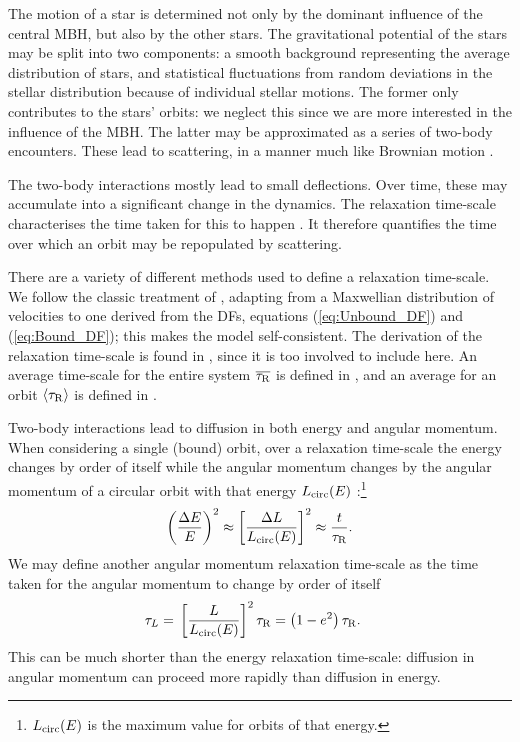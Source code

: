 The motion of a star is determined not only by the dominant influence of the central MBH, but also by the other stars. The gravitational potential of the stars may be split into two components: a smooth background representing the average distribution of stars, and statistical fluctuations from random deviations in the stellar distribution because of individual stellar motions. The former only contributes to the stars' orbits: we neglect this since we are more interested in the influence of the MBH. The latter may be approximated as a series of two-body encounters. These lead to scattering, in a manner much like Brownian motion \citep{Bekenstein1992,Maoz1993,Nelson1999}.

The two-body interactions mostly lead to small deflections. Over time, these may accumulate into a significant change in the dynamics. The relaxation time-scale characterises the time taken for this to happen \citep[section 1.2.1]{Binney2008}. It therefore quantifies the time over which an orbit may be repopulated by scattering.

There are a variety of different methods used to define a relaxation time-scale. We follow the classic treatment of \citet[chapter 2]{Chandrasekhar1960}, adapting from a Maxwellian distribution of velocities to one derived from the DFs, equations (\ref{eq:Unbound_DF}) and (\ref{eq:Bound_DF}); this makes the model self-consistent. The derivation of the relaxation time-scale is found in , since it is too involved to include here. An average time-scale for the entire system $\overline{\tau_\mathrm{R}}$ is defined in , and an average for an orbit $\left\langle\tau_\mathrm{R}\right\rangle$ is defined in . 

Two-body interactions lead to diffusion in both energy and angular momentum. When considering a single (bound) orbit, over a relaxation time-scale the energy changes by order of itself while the angular momentum changes by the angular momentum of a circular orbit with that energy $L_\mathrm{circ}(E)$ \citep{Lightman1977, Rauch1996, Hopman2005, Madigan2011}:\footnote{$L_\mathrm{circ}(E)$ is the maximum value for orbits of that energy.}
\begin{equation}
\left(\dfrac{\Delta E}{E}\right)^{2} \approx \left[\dfrac{\Delta L}{L_\mathrm{circ}(E)}\right]^{2} \approx \dfrac{t}{\tau_\mathrm{R}}.
\label{eq:diffuse-relax}
\end{equation}
We may define another angular momentum relaxation time-scale as the time taken for the angular momentum to change by order of itself \citep{Merritt2011}
\begin{align}
\tau_L = {} & \left[\dfrac{L}{L_\mathrm{circ}(E)}\right]^2\tau_\mathrm{R} = \left(1 - e^2\right) \tau_\mathrm{R}.
\label{eq:J-time}
\end{align}
This can be much shorter than the energy relaxation time-scale: diffusion in angular momentum can proceed more rapidly than diffusion in energy.

